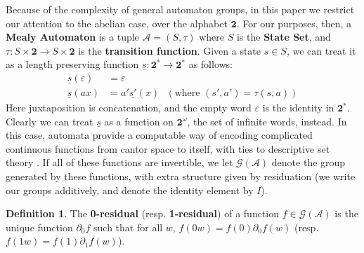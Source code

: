 \documentclass{article}
\newcommand{\A}{\mathcal{A}}
\newcommand{\G}{\mathcal{G}}
\newcommand{\2}{\textbf{2}}
\newcommand{\del}{\partial}
\theoremstyle{definition}
\newtheorem{defn}{Definition}
\begin{document}
\begin{center}
\end{center}

Because of the complexity of general automaton groups, in this paper we
restrict our attention to the abelian case, over the alphabet $\2$. 
For our purposes, then, a \textbf{Mealy Automaton} is a tuple $\A = (S, \tau)$
where $S$ is the \textbf{State Set}, and $\tau : S \times \2 \to S \times \2$ 
is the \textbf{transition function}. 
Given a state $s \in S$, we can treat it as a length preserving function 
$\underline{s} : \2^* \to \2^*$ as follows:
\begin{align*}
  \underline{s}(\varepsilon) &= \varepsilon\\
  \underline{s}(ax)       &= a' \underline{s'}(x) 
  ~~~(\text{where } (s', a') = \tau(s,a))
\end{align*}
Here juxtaposition is concatenation, and the empty word $\varepsilon$ is
the identity in $\2^*$. Clearly we can treat 
$\underline{s}$ as a function on $\2^\omega$, the set of infinite words, 
instead. In this case, automata provide a computable way of encoding 
complicated continuous functions from cantor space to itself, with ties to
descriptive set theory \cite{skrzypczak15:descriptive}.
If all of these functions are invertible, we let $\G(\A)$ denote
the group generated by these functions, with extra structure given by 
residuation (we write our groups additively, and denote the identity 
element by $I$). 

\begin{defn}
  The \textbf{0-residual} (resp. \textbf{1-residual}) of a 
  function $f \in \G(\A)$ is the unique function 
  $\del_0 f$ such that for all $w$, $f(0w) = f(0) \del_0 f(w)$ 
  (resp. $f(1w) = f(1) \del_1 f(w)$). 
\end{defn}
\end{document}
